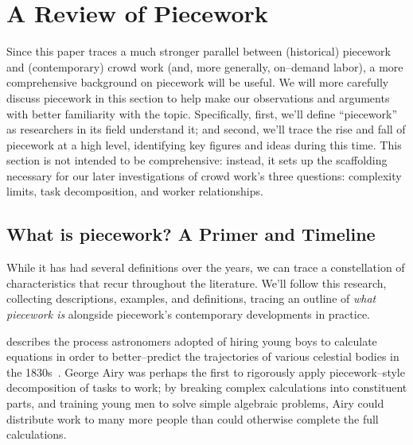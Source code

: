 \documentclass[trackingWork]{subfiles}
\begin{document}
\section{A Review of Piecework}

Since this paper traces a much stronger parallel between
(historical) piecework and (contemporary) crowd work
(and, more generally, on--demand labor),
a more comprehensive background on piecework will be useful.
We will more carefully discuss piecework in this section
to help make our observations and arguments with better familiarity with the topic.
Specifically,
first, we'll define ``piecework'' as researchers in its field understand it;
and second, we'll trace the rise and fall of piecework at a high level,
identifying key figures and ideas during this time.
This section is not intended to be comprehensive:
instead, it sets up the scaffolding necessary for
our later investigations of crowd work's three questions:
complexity limits,
task decomposition, and
worker relationships.




\subsection{What is piecework? A Primer and Timeline}\label{sec:whatIsPiecework}

While it has had several definitions over the years,
we can trace a constellation of characteristics that recur throughout the literature.
We'll follow this research, collecting
descriptions,
examples, and
definitions,
tracing an outline of
\textit{what piecework is}
alongside piecework's contemporary developments in practice.

\citeauthor{grier2013computers} describes the process astronomers adopted of hiring young boys
to calculate equations in order
to better--predict the trajectories of various celestial bodies in the 1830s~\cite{grier2013computers}.
George Airy was perhaps the first to rigorously apply piecework--style decomposition of tasks to work;
by breaking complex calculations into constituent parts, and
training young men to solve simple algebraic problems,
Airy could distribute work to many more people than could otherwise complete the full calculations.
\end{document}
